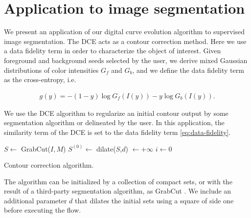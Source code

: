 \documentclass[smallextended]{svjour3}       %
\begin{document}
{{\section{Application to image segmentation}

We present an application of our digital curve evolution algorithm to supervised image segmentation. The DCE acts as a
contour correction method. Here we use a data fidelity term in order to characterize the object of
interest. Given foreground and background seeds selected by the user, we derive mixed Gaussian distributions  of color
intensities $G_f$ and $G_b$, and we define the data fidelity term as the cross-entropy, i.e.
	
\begin{align}
  g(y) = -(1-y)\log{G_f(I(y))} - y\log{G_b(I(y))}.
  \label{eq:data-fidelity}
\end{align}	

We use the DCE algorithm to regularize an initial contour output by some segmentation algorithm or delineated by the user. In this application, the similarity term of the DCE
is set to the data fidelity term \eqref{eq:data-fidelity}.
	
\begin{algorithm}[H]
 
 \BlankLine

 $S \longleftarrow$ GrabCut($I,M$)\;
 $S^{(0)} \longleftarrow $ dilate($S$,$d$)\; 
 \Delta $\longleftarrow +\infty$\;
 $i \longleftarrow 0$\;
 \label{alg:contour-correction} 
 \caption{Contour correction algorithm.}
\end{algorithm}	

The algorithm can be initialized by a collection of compact sets, or with the result of a third-party segmentation algorithm, as GrabCut \cite{rother04grabcut}. We include an additional parameter $d$ that dilates the initial sets using a square of side one before executing the flow.
	
}}
\end{document}
